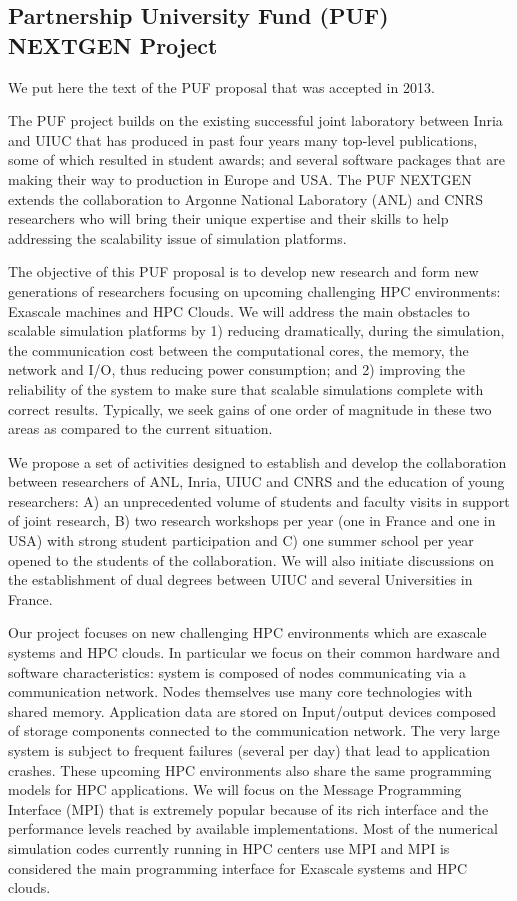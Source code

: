 \documentclass[12pt]{article}
\theoremstyle{definition}
\begin{document}
\subsection{Partnership University Fund (PUF) NEXTGEN Project} 
We put here the text of the PUF proposal that was accepted in 2013.

The PUF project builds on the existing successful joint laboratory between Inria and UIUC that has produced in past four years many top-level publications, some of which resulted in student awards;  and several software packages that are making their way to production in Europe and USA. The PUF NEXTGEN extends the collaboration to Argonne National Laboratory (ANL) and CNRS researchers who will bring their unique expertise and their skills to help addressing the scalability issue of simulation platforms. 

The objective of this PUF proposal is to develop new research and form new generations of researchers focusing on upcoming challenging HPC environments: Exascale machines and HPC Clouds. We will address the main obstacles to scalable simulation platforms by 1) reducing dramatically, during the simulation, the communication cost between the computational cores, the memory, the network and I/O,  thus reducing power consumption; and 2) improving the reliability of the system to make sure that scalable simulations complete with correct results. Typically, we seek gains of one order of magnitude in these two areas as compared to the current situation.

We propose a set of activities designed to establish and develop the collaboration between researchers of ANL, Inria, UIUC and CNRS and the education of young researchers: A) an unprecedented volume of students and faculty visits in support of joint research, B) two research workshops per year (one in France and one in USA) with strong student participation and C) one summer school per year opened to the students of the collaboration. We will also initiate discussions on the establishment of dual degrees between UIUC and several Universities in France.

Our project focuses on new challenging HPC environments which are exascale systems and HPC clouds. In particular we focus on their common hardware and software characteristics: system is composed of nodes communicating via a communication network. Nodes themselves use many core technologies with shared memory. Application data are stored on Input/output devices composed of storage components connected to the communication network. The very large system is subject to frequent failures (several per day) that lead to application crashes. These upcoming HPC environments also share the same programming models for HPC applications. We will focus on the Message Programming Interface (MPI) that is extremely popular because of its rich interface and the performance levels reached by available implementations. Most of the numerical simulation codes currently running in HPC centers use MPI and MPI is considered the main programming interface for Exascale systems and HPC clouds.
\end{document}

